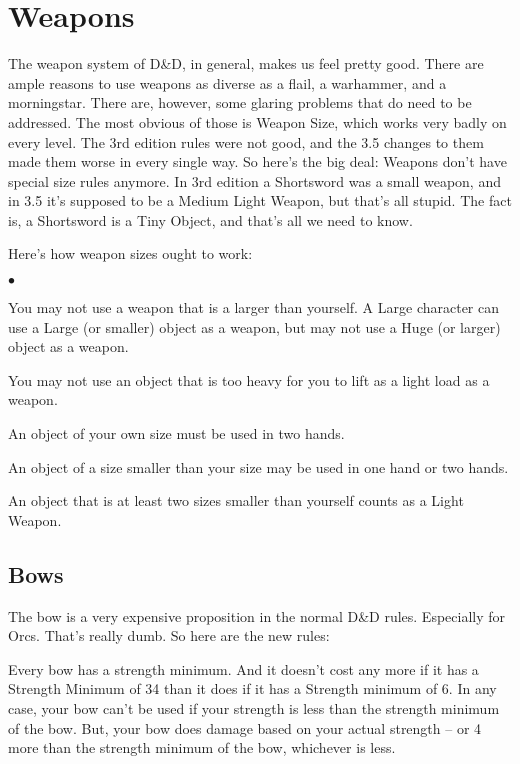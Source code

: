 \section{Weapons}
\vspace*{-10pt}


The weapon system of D\&D, in general, makes us feel pretty good. There are ample reasons to use weapons as diverse as a flail, a warhammer, and a morningstar. There are, however, some glaring problems that do need to be addressed. The most obvious of those is Weapon Size, which works very badly on every level. The 3rd edition rules were not good, and the 3.5 changes to them made them worse in every single way. So here's the big deal: Weapons don't have special size rules anymore. In 3rd edition a Shortsword was a small weapon, and in 3.5 it's supposed to be a Medium Light Weapon, but that's all stupid. The fact is, a Shortsword is a Tiny Object, and that's all we need to know.

Here's how weapon sizes ought to work:

\begin{list}{$\bullet$}{\itemspace}
    \item You may not use a weapon that is a larger than yourself. A Large character can use a Large (or smaller) object as a weapon, but may not use a Huge (or larger) object as a weapon.
    \item You may not use an object that is too heavy for you to lift as a light load as a weapon.
    \item An object of your own size must be used in two hands.
    \item An object of a size smaller than your size may be used in one hand or two hands.
    \item An object that is at least two sizes smaller than yourself counts as a Light Weapon.
\end{list}


\subsection{Bows}

The bow is a very expensive proposition in the normal D\&D rules. Especially for Orcs. That's really dumb. So here are the new rules:

Every bow has a strength minimum. And it doesn't cost any more if it has a Strength Minimum of 34 than it does if it has a Strength minimum of 6. In any case, your bow can't be used if your strength is less than the strength minimum of the bow. But, your bow does damage based on your actual strength -- or 4 more than the strength minimum of the bow, whichever is less.


